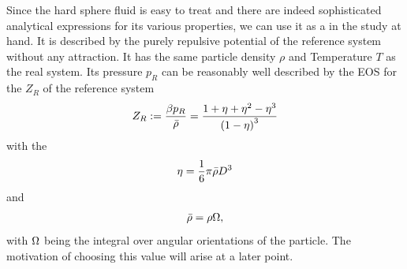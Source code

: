 \documentclass[8.5pt,twoside,twocolumn]{article}
\theoremstyle{standard}
\begin{document}
Since the hard sphere fluid is easy to treat and there are indeed sophisticated analytical
expressions for its various properties, we can use it as a  in the
study at hand. It is described by the purely repulsive potential of the reference system
without any attraction. It has the same particle density $\rho$ and Temperature $T$ as the
real system. Its pressure $p_R$ can be reasonably well described by the 
EOS\cite{CarnahanStarling} for the  $Z_R$ of the reference system
\begin{equation}
Z_R:=\frac{\beta p_R}{\bar\rho}=\frac{1+\eta+\eta^2-\eta^3}{\left({1-\eta}\right)^3}
\label{TPT:CSEOS}
\end{equation}
with the 
\begin{equation}
\eta=\frac 1 6 \pi\bar\rho D^3
\label{TPT:eta}
\end{equation}
and
\begin{equation}
\bar\rho=\rho \Omega,
\label{TPT:rhobar}
\end{equation}
with $\Omega$ being the integral over angular orientations of
the particle. The motivation of choosing this value will arise at a later point.
\end{document}
